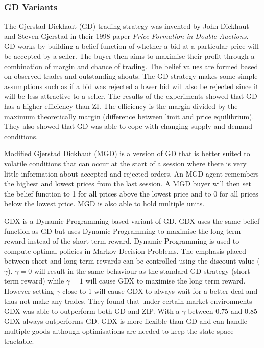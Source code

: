 \documentclass{acm_proc_article-sp}
\begin{document}
\subsubsection{GD Variants} \label{sec:traders_GDV}

The Gjerstad Dickhaut (GD) trading strategy was invented by John Dickhaut and
Steven Gjerstad in their 1998 paper \emph{Price Formation in Double
Auctions}\cite{gd}.
GD works by building a belief function of whether a bid at a particular price
will be accepted by a seller.
The buyer then aims to maximise their profit through a combination of margin
and chance of trading.
The belief values are formed based on observed trades and outstanding shouts.
The GD strategy makes some simple assumptions such as if a bid was rejected a
lower bid will also be rejected since it will be less attractive to a seller.
The results of the experiments showed that GD has a higher efficiency than ZI.
The efficiency is the margin divided by the maximum theoretically margin
(difference between limit and price equilibrium).
They also showed that GD was able to cope with changing supply and demand
conditions.

Modified Gjerstad Dickhaut (MGD) \cite{mgd} is a version of GD that
is better suited to volatile conditions that can occur at the start of a
session where there is very little information about accepted and rejected
orders.
An MGD agent remembers the highest and lowest prices from the last session.
A MGD buyer will then set the belief function to 1 for all prices above the
lowest price and to 0 for all prices below the lowest price.
MGD is also able to hold multiple units.

GDX\cite{gdx} is a Dynamic Programming based variant of GD.
GDX uses the same belief function as GD but uses Dynamic Programming to
maximise the long term reward instead of the short term reward.
Dynamic Programming is used to compute optimal policies in Markov Decision
Problems.
The emphasis placed between short and long term rewards can be controlled using
the discount value ($\gamma$).
$\gamma = 0$ will result in the same behaviour as the standard GD strategy
(short-term reward) while $\gamma = 1$ will cause GDX to maximise the long term
reward.
However setting $\gamma$ close to 1 will cause GDX to always wait for a better
deal and thus not make any trades.
They found that under certain market environments GDX was able to outperform
both GD and ZIP.
With a $\gamma$ between 0.75 and 0.85 GDX always outperforms GD.
GDX is more flexible than GD and can handle multiple goods although
optimisations are needed to keep the state space tractable.
\end{document}
